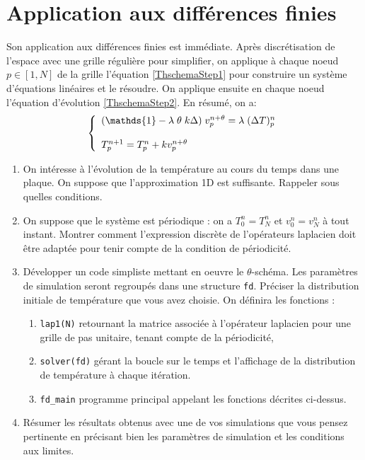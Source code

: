\documentclass[a4paper, 12pt]{article}
\begin{document}
 \section{Application aux différences finies}
 
 Son application aux différences finies est immédiate. Après discrétisation de l'espace
 avec une grille régulière pour simplifier, on applique à chaque noeud $p \in [1, N]$ de la grille
 l'équation \eqref{ThschemaStep1} pour construire un système d'équations linéaires
 et le résoudre. On applique ensuite en chaque noeud l'équation d'évolution \eqref{ThschemaStep2}. 
 En résumé, on a:
 \begin{eqnarray}\left\{ 
\begin{array}{l l l}
   ( \mathds{1} -\lambda\; \theta\; k \Delta)\; v_p^{n + \theta} = \lambda\; (\Delta T)_p^n \\
   \\
 T_p^{n+1} = T_p^n+ k   v_p^{n+\theta} \end{array} \right. 
  \label{FDschema}
  \end{eqnarray}

\begin{enumerate} 
 \item On intéresse à l'évolution de la température au cours du temps dans une plaque.
 On suppose que l'approximation 1D est suffisante. Rappeler sous quelles conditions.
 \item On suppose que le système est périodique : on a  $T_{0}^n=T_N^n$ et $v_{0}^n=v_N^n$ à tout instant.
 Montrer comment l'expression discrète de l'opérateurs laplacien doit être adaptée
  pour tenir compte de la condition de périodicité.
 
 \item Développer un code simpliste mettant en oeuvre le $\theta$-schéma. Les paramètres de simulation
 seront regroupés dans une structure {\tt fd}.   Préciser la distribution initiale de température
 que vous avez choisie.
 On définira les fonctions :
 \begin{enumerate} 
 \item  {\tt lap1(N)} retournant la matrice associée à l'opérateur laplacien pour une grille de pas unitaire, tenant
 compte de la périodicité,
 \item {\tt solver(fd)} gérant la boucle sur le temps et l'affichage 
 de la distribution de température à chaque itération.
 \item {\tt fd\_main} programme principal appelant les fonctions décrites ci-dessus.
  \end{enumerate}

 \item Résumer les résultats obtenus avec une de vos simulations que vous pensez pertinente 
 en précisant bien les paramètres de simulation et les conditions aux limites.
\end{enumerate} 
\end{document}
